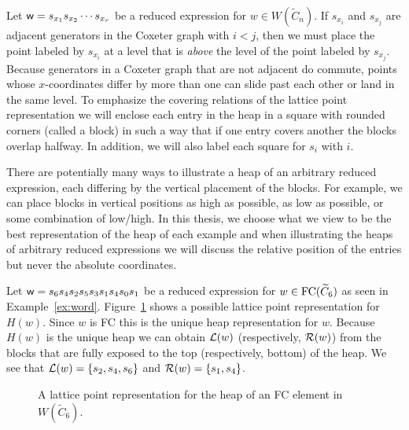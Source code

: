 Let $\mathsf{w}=s_{x_1}s_{x_2}\cdots s_{x_r}$ be a reduced expression for $w \in W(\widetilde{C}_n)$. If $s_{x_i}$ and $s_{x_j}$ are adjacent generators in the Coxeter graph with $i<j$, then we must place the point labeled by $s_{x_i}$ at a level that is \emph{above} the level of the point labeled by $s_{x_j}$. Because generators in a Coxeter graph that are not adjacent do commute, points whose $x$-coordinates differ by more than one can slide past each other or land in the same level. To emphasize the covering relations of the lattice point representation we will enclose each entry in the heap in a square with rounded corners (called a block) in such a way that if one entry covers another the blocks overlap halfway. In addition, we will also label each square for $s_i$ with $i$.

There are potentially many ways to illustrate a heap of an arbitrary reduced expression, each differing by the vertical placement of the blocks. For example, we can place blocks in vertical positions as high as possible, as low as possible, or some combination of low/high. In this thesis, we choose what we view to be the best representation of the heap of each example and when illustrating the heaps of arbitrary reduced expressions we will discuss the relative position of the entries but never the absolute coordinates. 

\begin{example}
	Let $\mathsf{w}=s_6s_4s_2s_5s_3s_1s_4s_0s_1$ be a reduced expression for $w \in \mathrm{FC}(\widetilde{C}_6)$ as seen in Example~\ref{ex:word}. Figure~\ref{fig:FC heap} shows a possible lattice point representation for $H(w)$. Since $w$ is FC this is the unique heap representation for $w$. Because $H(w)$ is the unique heap we can obtain $\mathcal{L}(w)$ (respectively, $\mathcal{R}(w)$) from the blocks that are fully exposed to the top (respectively, bottom) of the heap. We see that $\mathcal{L}(w)=\{s_2,s_4,s_6\}$ and $\mathcal{R}(w)=\{s_1,s_4\}$.
\begin{figure}[h]
\centering
{}
\caption{A lattice point representation for the heap of an FC element in $W(\widetilde{C}_6)$.}
\label{fig:FC heap}
\end{figure}
\end{example}

